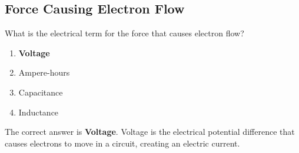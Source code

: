 \subsection{Force Causing Electron Flow}
\label{T5A05}

\begin{tcolorbox}[colback=gray!10!white,colframe=black!75!black,title=T5A05]
What is the electrical term for the force that causes electron flow?
\begin{enumerate}[noitemsep]
    \item \textbf{Voltage}
    \item Ampere-hours
    \item Capacitance
    \item Inductance
\end{enumerate}
\end{tcolorbox}

The correct answer is \textbf{Voltage}. Voltage is the electrical potential difference that causes electrons to move in a circuit, creating an electric current.